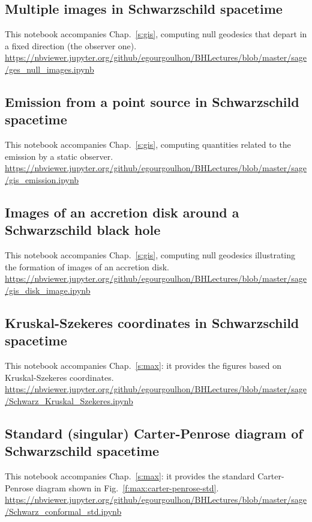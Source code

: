 \subsection{Multiple images in Schwarzschild spacetime} \label{s:sam:ges_null_images}
%
This notebook accompanies Chap.~\ref{s:gis}, computing null geodesics that
depart in a fixed direction (the observer one).\\[1ex]
{\footnotesize
\url{https://nbviewer.jupyter.org/github/egourgoulhon/BHLectures/blob/master/sage/ges_null_images.ipynb}
}

\subsection{Emission from a point source in Schwarzschild spacetime} \label{s:sam:gis_emission}
%
This notebook accompanies Chap.~\ref{s:gis}, computing quantities related to the
emission by a static observer.\\[1ex]
{\footnotesize
\url{https://nbviewer.jupyter.org/github/egourgoulhon/BHLectures/blob/master/sage/gis_emission.ipynb}
}

\subsection{Images of an accretion disk around a Schwarzschild black hole} \label{s:sam:gis_disk_image}
%
This notebook accompanies Chap.~\ref{s:gis}, computing null geodesics illustrating the formation of images of an accretion disk.\\[1ex]
{\footnotesize
\url{https://nbviewer.jupyter.org/github/egourgoulhon/BHLectures/blob/master/sage/gis_disk_image.ipynb}
}

\subsection{Kruskal-Szekeres coordinates in Schwarzschild spacetime}

This notebook accompanies Chap.~\ref{s:max}: it provides the figures based on
Kruskal-Szekeres coordinates.\\[1ex]
{\footnotesize
\url{https://nbviewer.jupyter.org/github/egourgoulhon/BHLectures/blob/master/sage/Schwarz_Kruskal_Szekeres.ipynb}
}

\subsection{Standard (singular) Carter-Penrose diagram of Schwarzschild spacetime}
\label{s:sam:std_Carter-Penrose}
This notebook accompanies Chap.~\ref{s:max}: it provides the standard
Carter-Penrose diagram shown in Fig.~\ref{f:max:carter-penrose-std}.\\[1ex]
{\footnotesize
\url{https://nbviewer.jupyter.org/github/egourgoulhon/BHLectures/blob/master/sage/Schwarz_conformal_std.ipynb}
}

